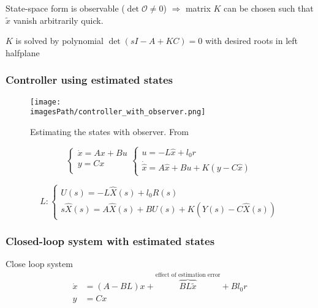 State-space form is observable ($\det{\mathcal{O}}\neq0$) $\Rightarrow$ matrix $K$ can
be chosen such that $\tilde{x}$ vanish arbitrarily quick.

$K$ is solved by polynomial $\det(sI-A+KC)=0$ with desired roots in left halfplane

\subsubsection{Controller using estimated states}
\begin{figure}[!h]
    \centering
    \texttt{[image: \\imagesPath/controller\_with\_observer.png]}
    \caption{Estimating the states with observer. From \cite{}}
\end{figure}

\begin{equation*}
    \begin{cases}
        \dot{x} = Ax + Bu \\
        y = Cx \\
    \end{cases}
    \begin{cases}
       u = -L\hat{x} + l_0r \\
       \dot{\hat{x}} = A\hat{x} + Bu + K(y-C\hat{x})
    \end{cases}
\end{equation*}

\begin{equation*}
    L: 
    \begin{cases}
        U(s) = -L\hat{X}(s) + l_0R(s) \\
        s\hat{X}(s) = A\hat{X}(s) + BU(s) + K(Y(s) - C\hat{X}(s))
    \end{cases}
\end{equation*}

\subsubsection{Closed-loop system with estimated states}
Close loop system
\begin{align*}
    \dot{x} &= (A-BL)x + \overbrace{BL\tilde{x}}^{\text{effect of estimation error}} + Bl_0r \\
    y &= Cx
\end{align*}

